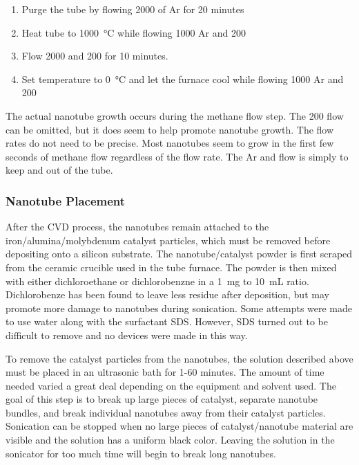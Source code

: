 \begin{enumerate}
	\item Purge the tube by flowing \SI{2000}{\sccm} of Ar for 20 minutes
	\item Heat tube to \SI{1000}{\degreeCelsius} while flowing \SI{1000}{\sccm} Ar and \SI{200}{\sccm} 
	\item Flow \SI{2000}{\sccm}  and \SI{200}{\sccm}  for 10 minutes.
	\item Set temperature to \SI{0}{\degreeCelsius} and let the furnace cool while flowing \SI{1000}{\sccm} Ar and \SI{200}{\sccm} 
\end{enumerate}

\noindent The actual nanotube growth occurs during the methane flow step. The \SI{200}{\sccm}  flow can be omitted, but it does seem to help promote nanotube growth. The flow rates do not need to be precise. Most nanotubes seem to grow in the first few seconds of methane flow regardless of the flow rate. The Ar and  flow is simply to keep  and  out of the tube. 

\subsubsection{Nanotube Placement}

After the CVD process, the nanotubes remain attached to the iron\slash alumina\slash molybdenum catalyst particles, which must be removed before depositing onto a silicon substrate. The nanotube\slash catalyst powder is first scraped from the ceramic crucible used in the tube furnace. The powder is then mixed with either dichloroethane or dichlorobenzne in a \SI{1}{\milli\gram} to \SI{10}{\milli\liter} ratio. Dichlorobenze has been found to leave less residue after deposition, but may promote more damage to nanotubes during sonication. Some attempts were made to use water along with the surfactant SDS. However, SDS turned out to be difficult to remove and no devices were made in this way.

To remove the catalyst particles from the nanotubes, the solution described above must be placed in an ultrasonic bath for 1-60 minutes. The amount of time needed varied a great deal depending on the equipment and solvent used. The goal of this step is to break up large pieces of catalyst, separate nanotube bundles, and break individual nanotubes away from their catalyst particles. Sonication can be stopped when no large pieces of catalyst\slash nanotube material are visible and the solution has a uniform black color. Leaving the solution in the sonicator for too much time will begin to break long nanotubes. 

